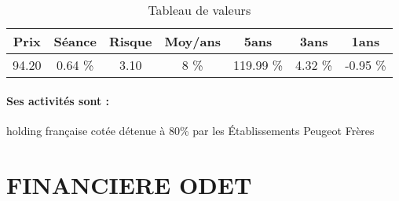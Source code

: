 \documentclass[11pt,a4paper]{report}%
\begin{document}
\begin{table}[H]
  \centering
    \begin{tabular}{|c|c|c|c|c|c|c|}
    \hline
    Prix & Séance & Risque  & Moy/ans & 5ans & 3ans & 1ans \\
    \hline
    94.20 &    0.64 \%    & 3.10 & 8 \% & 119.99 \% & 4.32 \% & -0.95 \% \\
    \hline
    \end{tabular}%
        \label{tab:table_FFP}%
      \caption{Tableau de valeurs}
\end{table}%

\paragraph{Ses activités sont : } holding française cotée détenue à 80\% par les Établissements Peugeot Frères 
    
    \newpage

\section{FINANCIERE ODET}
\end{document}
